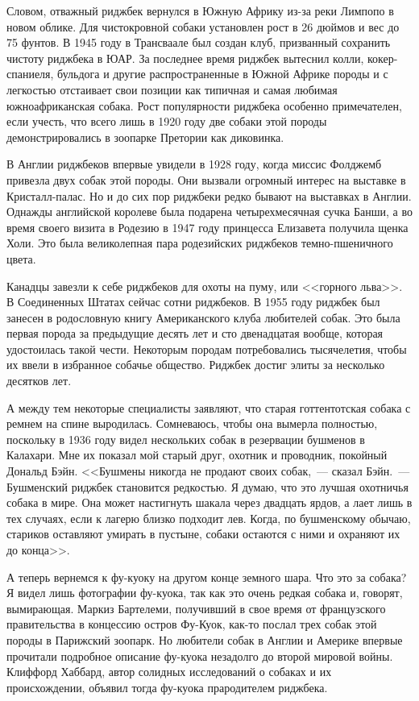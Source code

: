 \documentclass[12pt,a4paper,twoside,openany,svgnames]{memoir}
\begin{document}
Словом, отважный риджбек вернулся в Южную Африку из-за реки Лимпопо в новом облике. Для чистокровной собаки установлен рост в 26 дюймов и вес до 75 фунтов. В 1945 году в Трансваале был создан клуб, призванный сохранить чистоту риджбека в ЮАР. За последнее время риджбек вытеснил колли, кокер-спаниеля, бульдога и другие распространенные в Южной Африке породы и с легкостью отстаивает свои позиции как типичная и самая любимая южноафриканская собака. Рост популярности риджбека особенно примечателен, если учесть, что всего лишь в 1920 году две собаки этой породы демонстрировались в зоопарке Претории как диковинка.

В Англии риджбеков впервые увидели в 1928 году, когда миссис Фолджемб привезла двух собак этой породы. Они вызвали огромный интерес на выставке в Кристалл-палас. Но и до сих пор риджбеки редко бывают на выставках в Англии. Однажды английской королеве была подарена четырехмесячная сучка Банши, а во время своего визита в Родезию в 1947 году принцесса Елизавета получила щенка Холи. Это была великолепная пара родезийских риджбеков темно-пшеничного цвета.

Канадцы завезли к себе риджбеков для охоты на пуму, или <<горного льва>>. В Соединенных Штатах сейчас сотни риджбеков. В 1955 году риджбек был занесен в родословную книгу Американского клуба любителей собак. Это была первая порода за предыдущие десять лет и сто двенадцатая вообще, которая удостоилась такой чести. Некоторым породам потребовались тысячелетия, чтобы их ввели в избранное собачье общество. Риджбек достиг элиты за несколько десятков лет.

А между тем некоторые специалисты заявляют, что старая готтентотская собака с ремнем на спине выродилась. Сомневаюсь, чтобы она вымерла полностью, поскольку в 1936 году видел нескольких собак в резервации бушменов в Калахари. Мне их показал мой старый друг, охотник и проводник, покойный Дональд Бэйн. <<Бушмены никогда не продают своих собак,~--- сказал Бэйн.~--- Бушменский риджбек становится редкостью. Я думаю, что это лучшая охотничья собака в мире. Она может настигнуть шакала через двадцать ярдов, а лает лишь в тех случаях, если к лагерю близко подходит лев. Когда, по бушменскому обычаю, стариков оставляют умирать в пустыне, собаки остаются с ними и охраняют их до конца>>.

А теперь вернемся к фу-куоку на другом конце земного шара. Что это за собака? Я видел лишь фотографии фу-куока, так как это очень редкая собака и, говорят, вымирающая. Маркиз Бартелеми, получивший в свое время от французского правительства в концессию остров Фу-Куок, как-то послал трех собак этой породы в Парижский зоопарк. Но любители собак в Англии и Америке впервые прочитали подробное описание фу-куока незадолго до второй мировой войны. Клиффорд Хаббард, автор солидных исследований о собаках и их происхождении, объявил тогда фу-куока прародителем риджбека.
\end{document}
